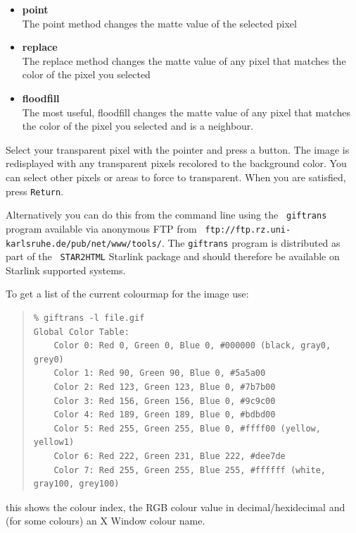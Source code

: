 \documentclass[twoside,11pt]{article}
\newcommand{\htmladdnormallink}[2]{#1}
\newcommand{\latex}[1]{#1}
\begin{document}
\begin{itemize}
\item{{\bf point}}\\
The point method changes the matte value of the selected pixel
\item{{\bf replace}}\\
The replace method changes the matte value of any pixel that matches
the color of the pixel you selected
\item{{\bf floodfill}}\\
The most useful, floodfill changes the matte value of any pixel that
matches the color of the pixel you selected and is a neighbour.
\end{itemize}

Select your transparent pixel with the pointer and press a button. The
image is redisplayed with any transparent pixels recolored to the
background color. You can select other pixels or areas to force to
transparent. When you are satisfied, press {\tt Return}. 

Alternatively you can do this from the command line using the
\htmladdnormallink{{\tt
giftrans}}{ftp://ftp.rz.uni-karlsruhe.de/pub/net/www/tools/}
program\latex{ available via anonymous FTP from
\htmladdnormallink{{\tt
ftp://ftp.rz.uni-karlsruhe.de/pub/net/www/tools/}}{ftp://ftp.rz.uni-karlsruhe.de/pub/net/www/tools/}}.
The {\tt giftrans} program is distributed as part of the {\tt
STAR2HTML} Starlink package and should therefore be available on
Starlink supported systems.

To get a list of the current colourmap for the image use:

\small
\begin{quote}
\begin{verbatim}
% giftrans -l file.gif
Global Color Table:
    Color 0: Red 0, Green 0, Blue 0, #000000 (black, gray0, grey0)
    Color 1: Red 90, Green 90, Blue 0, #5a5a00
    Color 2: Red 123, Green 123, Blue 0, #7b7b00
    Color 3: Red 156, Green 156, Blue 0, #9c9c00
    Color 4: Red 189, Green 189, Blue 0, #bdbd00
    Color 5: Red 255, Green 255, Blue 0, #ffff00 (yellow, yellow1)
    Color 6: Red 222, Green 231, Blue 222, #dee7de
    Color 7: Red 255, Green 255, Blue 255, #ffffff (white, gray100, grey100)
\end{verbatim}
\end{quote}
\normalsize

this shows the colour index, the RGB colour value in
decimal/hexidecimal and (for some colours) an X Window colour name.
\end{document}
